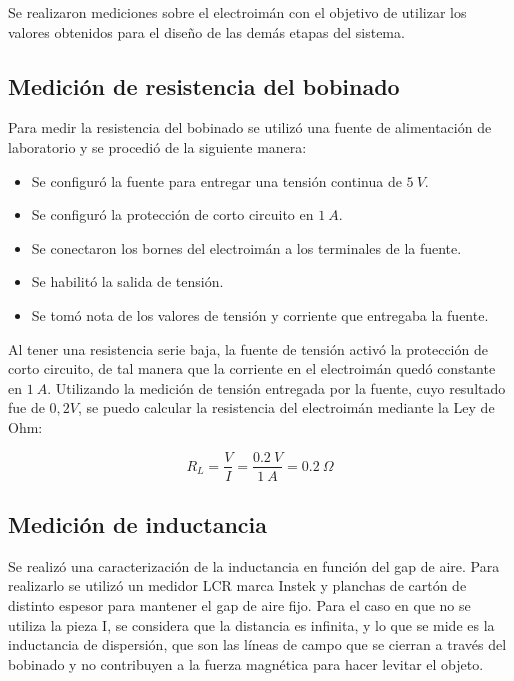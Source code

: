 \noindent Se realizaron mediciones sobre el electroimán con el objetivo de utilizar los valores obtenidos para el diseño de las demás etapas del sistema.

\subsection{Medición de resistencia del bobinado}

\noindent Para medir la resistencia del bobinado se utilizó una fuente de alimentación de laboratorio y se procedió de la siguiente manera:

\begin{itemize}
	\item Se configuró la fuente para entregar una tensión continua de $5\:V$.
	\item Se configuró la protección de corto circuito en $1\:A$.
	\item Se conectaron los bornes del electroimán a los terminales de la fuente.
	\item Se habilitó la salida de tensión.
	\item Se tomó nota de los valores de tensión y corriente que entregaba la fuente.
\end{itemize}

\noindent Al tener una resistencia serie baja, la fuente de tensión activó la protección de corto circuito, de tal manera que la corriente en el electroimán quedó constante en $1\:A$. Utilizando la medición de tensión entregada por la fuente, cuyo resultado fue de $0,2 V$, se puedo calcular la resistencia del electroimán mediante la Ley de Ohm:

\begin{equation}
	R_{L}=\frac{V}{I}=\frac{0.2\:V}{1\:A}=0.2\:\Omega
\end{equation}

\subsection{Medición de inductancia}

\noindent Se realizó una caracterización de la inductancia en función del gap de aire. Para realizarlo se utilizó un medidor LCR marca Instek y planchas de cartón de distinto espesor para mantener el gap de aire fijo. Para el caso en que no se utiliza la pieza I, se considera que la distancia es infinita, y lo que se mide es la inductancia de dispersión, que son las líneas de campo que se cierran a través del bobinado y no contribuyen a la fuerza magnética para hacer levitar el objeto.

